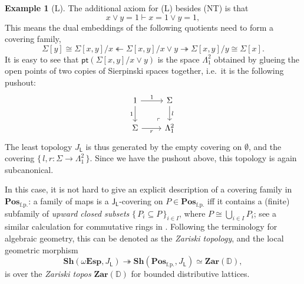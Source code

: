 \documentclass[a4paper,12pt]{amsart}
\theoremstyle{definition}
\newtheorem{example}[theorem]{Example}
\newcommand{\mb}[1]{\mathbf{#1}}
\newcommand{\mbb}[1]{\mathbb{#1}}
\newcommand{\mr}[1]{\mathrm{#1}}
\newcommand{\ms}[1]{\mathsf{#1}}
\newcommand{\Pos}{\mb{Pos}}
\newcommand{\sh}{\mb{Sh}}
\newcommand{\set}[1]{\{\,#1\,\}}
\newcommand{\surj}{\twoheadrightarrow}
\newcommand{\fp}{_{\mr{f.p.}}}
\newcommand{\emp}{\emptyset}
\newcommand{\pt}{\ms{pt}}
\newcommand{\wTop}{\omega\mb{Esp}}
\begin{document}
\begin{example}[L]
  The additional axiom for (L) besides (NT) is that 
  \[ x \vee y = 1 \vdash x = 1 \vee y = 1, \] 
  This means the dual embeddings of the following quotients need to form a covering family,
  \[ \Sigma[y] \cong \Sigma[x,y]/x \twoheadleftarrow \Sigma[x,y]/x\vee y \surj \Sigma[x,y]/y \cong \Sigma[x]. \]
  It is easy to see that $\pt(\Sigma[x,y]/x \vee y)$ is the space $\Lambda^2_1$ obtained by glueing the open points of two copies of Sierpinski spaces together, i.e.\ it is the following pushout:
  \[
  \begin{tikzcd}
    1 \ar[d, "1"'] \ar[r, "1"] & \Sigma \ar[d, "l"] \\ 
    \Sigma \ar[r, "r"'] & \Lambda^2_1
    \arrow["\lrcorner"{anchor=center, pos=0.125, rotate=180}, draw=none, from=2-2, to=1-1]    
  \end{tikzcd}
  \]
  The least topology $J_{\ms L}$ is thus generated by the empty covering on $\emp$, and the covering $\set{l,r : \Sigma \to \Lambda^2_1}$. Since we have the pushout above, this topology is again subcanonical. 
  
  In this case, it is not hard to give an explicit description of a covering family in $\Pos\fp$: a family of maps is a $\ms J_{\ms L}$-covering on $P \in \Pos\fp$ iff it contains a (finite) subfamily of \emph{upward closed subsets} $\set{P_i\subseteq P}_{i\in I}$, where $P \cong \bigcup_{i\in I}P_i$; see a similar calculation for commutative rings in \citet[VIII. 6]{maclane1992sheaves}. Following the terminology for algebraic geometry, this can be denoted as the \emph{Zariski topology}, and the local geometric morphism
  \[ \sh(\wTop,J_{\ms L}) \surj \sh(\Pos\fp,J_{\ms L}) \simeq \mb{Zar}(\mbb D), \]
  is over the \emph{Zariski topos} $\mb{Zar}(\mbb D)$ for bounded distributive lattices.
\end{example}
\end{document}
